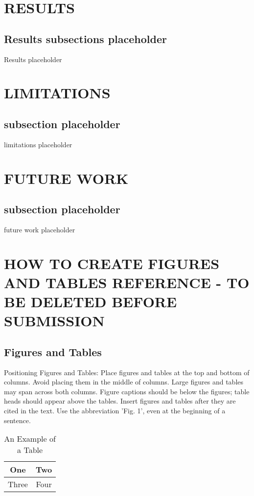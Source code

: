\documentclass[letterpaper, 10 pt, conference]{ieeeconf}  %
\begin{document}
\section{RESULTS}


\subsection{Results subsections placeholder} 


Results placeholder


\section{LIMITATIONS}

\subsection{subsection placeholder}

limitations placeholder


\section{FUTURE WORK}

\subsection{subsection placeholder}

future work placeholder


\section{HOW TO CREATE FIGURES AND TABLES REFERENCE - TO BE DELETED BEFORE SUBMISSION}
\subsection{Figures and Tables}

Positioning Figures and Tables: Place figures and tables at the top and bottom of columns. Avoid placing them in the middle of columns. Large figures and tables may span across both columns. Figure captions should be below the figures; table heads should appear above the tables. Insert figures and tables after they are cited in the text. Use the abbreviation 'Fig. 1', even at the beginning of a sentence.

\begin{table}[h]
\caption{An Example of a Table}
\label{table_example}
\begin{center}
\begin{tabular}{|c||c|}
\hline
One & Two\\
\hline
Three & Four\\
\hline
\end{tabular}
\end{center}
\end{table}
\end{document}
